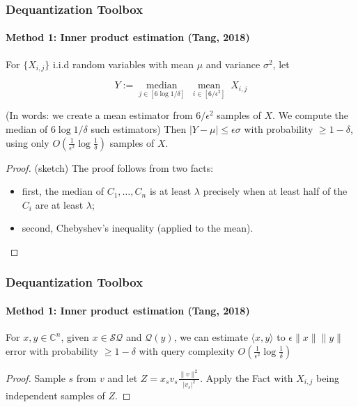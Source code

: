\documentclass{beamer}
\newcommand\0{\mathbf{0}}
\newcommand\CC{\mathbb{C}}
\newcommand\<{\langle}
\renewcommand\>{\rangle}
\begin{document}
\begin{frame}
\frametitle{Dequantization Toolbox}
\framesubtitle{Method 1: Inner product estimation (Tang, 2018)}
\begin{fact} For $\{X_{i,j}\}$ i.i.d random variables with mean $\mu$ and variance $\sigma^2$, let 

$$Y := \underset{j \in [6\log 1/\delta]}{\operatorname{median}}\;\underset{i \in [6/\epsilon^2]}{\operatorname{mean}}\;X_{i,j}$$
 
(In words: we create a mean estimator from $6/\epsilon^2$ samples of $X$. We compute the median of $6\log 1/\delta$ such estimators)
Then $\vert Y - \mu\vert \leq \epsilon\sigma$ with probability $\geq 1-\delta$, using only $O(\frac{1}{\epsilon^2}\log\frac{1}{\delta})$ samples of $X$.
\end{fact}
\begin{proof} (sketch) The proof follows from two facts: 
\begin{itemize}
\item first, the median of $C_1,\ldots,C_n$ is at least $\lambda$ precisely when at least half of the $C_i$ are at least $\lambda$; 
\item second, Chebyshev's inequality (applied to the mean).
\end{itemize}
\end{proof}
\end{frame}

\begin{frame}
\frametitle{Dequantization Toolbox}
\framesubtitle{Method 1: Inner product estimation (Tang, 2018)}
\begin{corollary} For $x,y \in\CC^n$, given $x \in \mathcal{SQ}$ and $\mathcal{Q}(y)$, we can estimate $\langle x,y\rangle$ to $\epsilon\|x\|\|y\|$ error with probability $\geq 1-\delta$ with query complexity $O(\frac{1}{\epsilon^2}\log\frac{1}{\delta})$
\end{corollary}

\begin{proof}Sample $s$ from $v$ and let $Z = x_s v_s\frac{\|v\|^2}{|v_s|^2}$. Apply the Fact with $X_{i,j}$ being independent samples of $Z$.
\end{proof}	
\end{frame}
\end{document}
